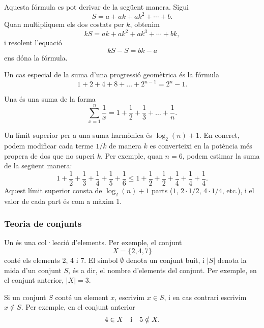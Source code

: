 Aquesta fórmula es pot derivar de la següent manera. Sigui
\[ S = a + ak + ak^2 + \cdots + b .\]
Quan multipliquem els dos costats per $k$, obtenim
\[ kS = ak + ak^2 + ak^3 + \cdots + bk,\]
i resolent l'equació
\[ kS-S = bk-a\]
ens dóna la fórmula.

Un cas especial de la suma d'una progressió geomètrica és la fórmula
\[1+2+4+8+\ldots+2^{n-1}=2^n-1.\]


Una  és una suma de la forma
\[ \sum_{x=1}^n \frac{1}{x} = 1+\frac{1}{2}+\frac{1}{3}+\ldots+\frac{1}{n} .\]

Un límit superior per a una suma harmònica és $\log_2(n)+1$.
En concret, podem
modificar cada terme $1/k$ de manera $k$ es converteixi en
la potència més propera de dos que no superi $k$.
Per exemple, quan $n=6$, podem estimar
la suma de la següent manera:
\[ 1+\frac{1}{2}+\frac{1}{3}+\frac{1}{4}+\frac{1}{5}+\frac{1}{6} \le
1+\frac{1}{2}+\frac{1}{2}+\frac{1}{4}+\frac{1}{4}+\frac{1}{4}.\]
Aquest límit superior consta de $\log_2(n)+1$ parts
($1$, $2 \cdot 1/2$, $4 \cdot 1/4$, etc.),
i el valor de cada part és com a màxim 1.

\subsubsection{Teoria de conjunts}


Un  és una col·lecció d'elements.
Per exemple, el conjunt
\[X=\{2,4,7\}\]
conté els elements 2, 4 i 7.
El símbol $\emptyset$ denota un conjunt buit,
i $|S|$ denota la mida d'un conjunt $S$,
és a dir, el nombre d'elements del conjunt.
Per exemple, en el conjunt anterior, $|X|=3$.

Si un conjunt $S$ conté un element $x$,
escrivim $x \in S$,
i en cas contrari escrivim $x \notin S$.
Per exemple, en el conjunt anterior
\[4 \in X \hspace{10px}\textrm{i}\hspace{10px} 5 \notin X.\]

